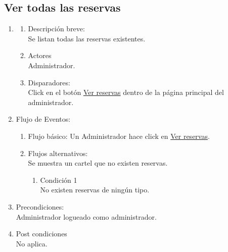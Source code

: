 \documentclass[a4paper,11pt]{article}
\begin{document}
\subsection{Ver todas las reservas}
\begin{enumerate}

    \item
    \begin{enumerate}
    \item Descripción breve: \\
        Se listan todas las reservas existentes.
    \item Actores \\
        Administrador.
    \item Disparadores: \\
        Click en el botón \underline{Ver reservas} dentro de la
        página principal del administrador.
    \end{enumerate}

    \item Flujo de Eventos: 

    \begin{enumerate}

        \item Flujo básico:
            Un Administrador hace click en \underline{Ver reservas}.
        \item Flujos alternativos:\\
            Se muestra un cartel que no existen reservas.
            \begin{enumerate}
                \item Condición 1 \\
                    No existen reservas de ningún tipo.
            \end{enumerate}

    \end{enumerate}

    \item Precondiciones: \\
        Administrador logueado como administrador.

    \item Post condiciones \\
        No aplica.

\end{enumerate}
\end{document}
